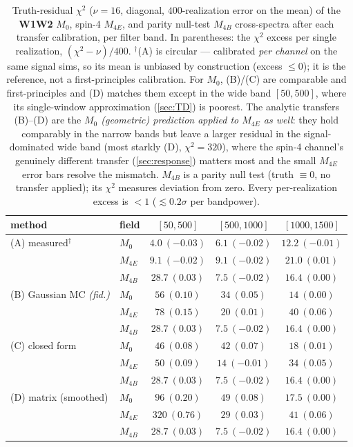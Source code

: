 \documentclass[11pt]{article}
\begin{document}
\begin{table}[h]
\centering
\begin{tabular}{llccc}
\toprule
method & field & $[50,500]$ & $[500,1000]$ & $[1000,1500]$\\
\midrule
(A) measured$^{\dagger}$       & $M_0$    & $4.0\ (-0.03)$  & $6.1\ (-0.02)$  & $12.2\ (-0.01)$\\
                               & $M_{4E}$ & $9.1\ (-0.02)$  & $9.1\ (-0.02)$  & $21.0\ (0.01)$\\
                               & $M_{4B}$ & $28.7\ (0.03)$  & $7.5\ (-0.02)$  & $16.4\ (0.00)$\\
\addlinespace
(B) Gaussian MC \emph{(fid.)}  & $M_0$    & $56\ (0.10)$    & $34\ (0.05)$    & $14\ (0.00)$\\
                               & $M_{4E}$ & $78\ (0.15)$    & $20\ (0.01)$    & $40\ (0.06)$\\
                               & $M_{4B}$ & $28.7\ (0.03)$  & $7.5\ (-0.02)$  & $16.4\ (0.00)$\\
\addlinespace
(C) closed form                & $M_0$    & $46\ (0.08)$    & $42\ (0.07)$    & $18\ (0.01)$\\
                               & $M_{4E}$ & $50\ (0.09)$    & $14\ (-0.01)$   & $34\ (0.05)$\\
                               & $M_{4B}$ & $28.7\ (0.03)$  & $7.5\ (-0.02)$  & $16.4\ (0.00)$\\
\addlinespace
(D) matrix (smoothed)          & $M_0$    & $96\ (0.20)$    & $49\ (0.08)$    & $17.5\ (0.00)$\\
                               & $M_{4E}$ & $320\ (0.76)$   & $29\ (0.03)$    & $41\ (0.06)$\\
                               & $M_{4B}$ & $28.7\ (0.03)$  & $7.5\ (-0.02)$  & $16.4\ (0.00)$\\
\bottomrule
\end{tabular}
\caption{Truth-residual $\chi^2$ ($\nu=16$, diagonal, $400$-realization error on
the mean) of the \textbf{W1W2} $M_0$, spin-4 $M_{4E}$, and parity null-test
$M_{4B}$ cross-spectra after each transfer calibration, per filter band.
In parentheses: the $\chi^2$ excess per single realization, $(\chi^2-\nu)/400$.
$^{\dagger}$(A) is circular --- calibrated \emph{per channel} on the same signal
sims, so its mean is unbiased by construction (excess $\le0$); it is the
reference, not a first-principles calibration. For $M_0$, (B)/(C) are comparable
and first-principles and (D) matches them except in the wide band $[50,500]$,
where its single-window approximation (\cref{sec:TD}) is poorest. The analytic
transfers (B)--(D) are the \emph{$M_0$ (geometric) prediction applied to $M_{4E}$
as well}: they hold comparably in the narrow bands but leave a larger residual in
the signal-dominated wide band (most starkly (D), $\chi^2=320$), where the spin-4
channel's genuinely different transfer (\cref{sec:response}) matters most and the
small $M_{4E}$ error bars resolve the mismatch. $M_{4B}$ is a parity null test
(truth $\equiv0$, no transfer applied); its $\chi^2$ measures deviation from zero.
Every per-realization excess is $<1$ ($\lesssim0.2\sigma$ per bandpower).}
\label{tab:transfer}
\end{table}
\end{document}

